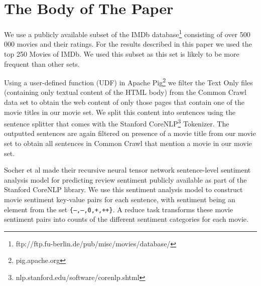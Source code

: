 \documentclass{acm_proc_article-sp}
\begin{document}
\section{The {\secit Body} of The Paper}
We use a publicly available subset of the IMDb database\footnote{ftp://ftp.fu-berlin.de/pub/misc/movies/database/} consisting of over 500 000 movies and their ratings. For the results described in this paper we used the top 250 Movies of IMDb. We used this subset as this set is likely to be more frequent than other sets.

Using a user-defined function (UDF) in Apache Pig\footnote{pig.apache.org} we filter the Text Only files (containing only textual content of the HTML body) from the Common Crawl data set to obtain the web content of only those pages that contain one of the movie titles in our movie set. We split this content into sentences using the sentence splitter that comes with the Stanford CoreNLP\footnote{nlp.stanford.edu/software/corenlp.shtml} Tokenizer. The outputted sentences are again filtered on presence of a movie title from our movie set to obtain all sentences in Common Crawl that mention a movie in our movie set.

Socher et al \cite{Socher2013} made their recursive neural tensor network sentence-level sentiment analysis model for predicting review sentiment publicly available as part of the Stanford CoreNLP library. We use this sentiment analysis model to construct movie sentiment key-value pairs for each sentence, with sentiment being an element from the set \texttt{\{\mbox{---},--,0,+,\mbox{++}\}}. A reduce task transforms these movie sentiment pairs into counts of the different sentiment categories for each movie. 
\end{document}
